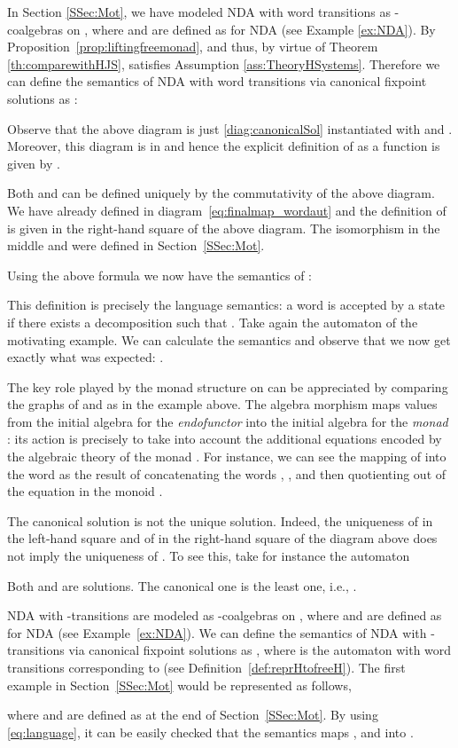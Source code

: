 \documentclass[oribibl,envcountsame,envcountsect,runningheads]{llncs}
\renewcommand{\>}{\rangle}
\begin{document}
\begin{example}
In Section \ref{SSec:Mot}, we have modeled NDA with word transitions as -coalgebras on , where  and  are defined as for NDA (see Example \ref{ex:NDA}). By Proposition~\ref{prop:liftingfreemonad},  and thus, by virtue of Theorem \ref{th:comparewithHJS},  satisfies Assumption \ref{ass:TheoryHSystems}. Therefore we can define the semantics of NDA with word transitions  via canonical fixpoint solutions as :

Observe that the above diagram is just \eqref{diag:canonicalSol} instantiated with  and . Moreover, this diagram is in  and hence the explicit definition of  as a function  is given by .

Both  and  can be defined uniquely by the commutativity of the above diagram.
We have already defined  in diagram~\eqref{eq:finalmap_wordaut} and the definition of  is given in the right-hand square of the above diagram. The isomorphism in the middle and  were defined in Section~\ref{SSec:Mot}.

Using the above formula  we now have the semantics of :

This definition is precisely the language semantics: a word  is accepted by a state  if there exists a decomposition  such that .
Take again the automaton of the motivating example. We can calculate the semantics and observe that we now get exactly what was expected: .

The key role played by the monad structure on  can be appreciated by comparing the graphs of  and  as in the example above. The algebra morphism  maps values from the initial algebra  for the \emph{endofunctor}  into the initial algebra  for the \emph{monad} : its action is precisely to take into account the additional equations encoded by the algebraic theory of the monad . For instance, we can see the mapping of  into the word  as the result of concatenating the words , ,  and then quotienting out of the equation  in the monoid .
\end{example}
\begin{remark}\label{rm:multiple}
The canonical solution  is not the unique solution. Indeed, the uniqueness of  in the left-hand square and of  in the right-hand square of the diagram above does not imply the uniqueness of . To see this, take for instance the automaton

Both  and  are solutions. The canonical one is the least one, i.e., .
\end{remark}
\begin{example}\label{ex:epselim}
NDA with -transitions are modeled as -coalgebras on , where  and  are defined as for NDA (see Example~\ref{ex:NDA}). We can define the semantics of NDA with -transitions via canonical fixpoint solutions as , where  is the automaton with word transitions corresponding to  (see Definition~\ref{def:reprHtofreeH}). The first example in Section~\ref{SSec:Mot}
would be represented as follows,

where  and  are defined as at the end of Section~\ref{SSec:Mot}.
By using \eqref{eq:language}, it can be easily checked that the semantics  maps  ,  and  into .
\end{example}
\end{document}
